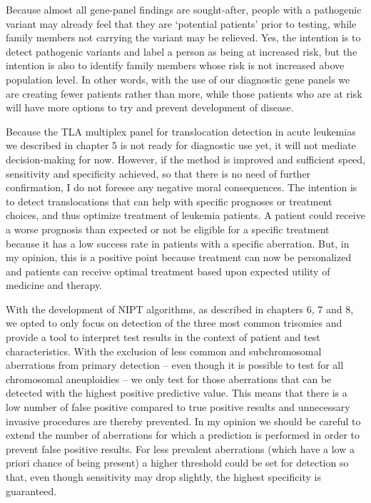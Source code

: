 Because almost all gene-panel findings are sought-after, people with a pathogenic variant may already feel that they are ‘potential patients’ prior to testing, while family members not carrying the variant may be relieved. 
Yes, the intention is to detect pathogenic variants and label a person as being at increased risk, but the intention is also to identify family members whose risk is not increased above population level. 
In other words, with the use of our diagnostic gene panels we are creating fewer patients rather than more, while those patients who are at risk will have more options to try and prevent development of disease. 

Because the TLA multiplex panel for translocation detection in acute leukemias we described in chapter 5 is not ready for diagnostic use yet, it will not mediate decision-making for now. 
However, if the method is improved and sufficient speed, sensitivity and specificity achieved, so that there is no need of further confirmation, I do not foresee any negative moral consequences. 
The intention is to detect translocations that can help with specific prognoses or treatment choices, and thus optimize treatment of leukemia patients. 
A patient could receive a worse prognosis than expected or not be eligible for a specific treatment because it has a low success rate in patients with a specific aberration. 
But, in my opinion, this is a positive point because treatment can now be personalized and patients can receive optimal treatment based upon expected utility of medicine and therapy. 

With the development of NIPT algorithms, as described in chapters 6, 7 and 8, we opted to only focus on detection of the three most common trisomies and provide a tool to interpret test results in the context of patient and test characteristics. 
With the exclusion of less common and subchromosomal aberrations from primary detection – even though it is possible to test for all chromosomal aneuploidies – we only test for those aberrations that can be detected with the highest positive predictive value. 
This means that there is a low number of false positive compared to true positive results and unnecessary invasive procedures are thereby prevented. 
In my opinion we should be careful to extend the number of aberrations for which a prediction is performed in order to prevent false positive results. 
For less prevalent aberrations (which have a low a priori chance of being present) a higher threshold could be set for detection so that, even though sensitivity may drop slightly, the highest specificity is guaranteed.
 
